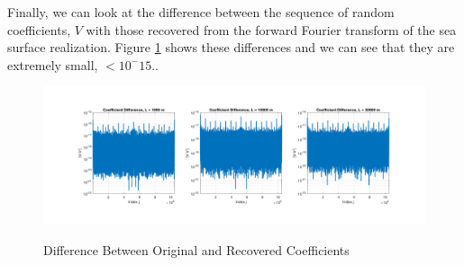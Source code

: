 Finally, we can look at the difference between the sequence of random coefficients, $V$ with those recovered from the forward Fourier transform of the sea surface realization. Figure \ref{os_fig:11} shows these differences and we can see that they are extremely small, $ < 10^-15$..
\begin{figure}[H]
  \begin{center}
\includegraphics[width=6in]{../media/Ocean_Surface/random_variable_diff_test.png}
  \end{center}
  \renewcommand{\baselinestretch}{1} \small\normalsize
  \begin{quote}
    \caption[Difference Between Original and Recovered Coefficients]{Difference Between Original and Recovered Coefficients\label{os_fig:11}}
  \end{quote}
\end{figure}
\renewcommand{\baselinestretch}{2} \small\normalsize
